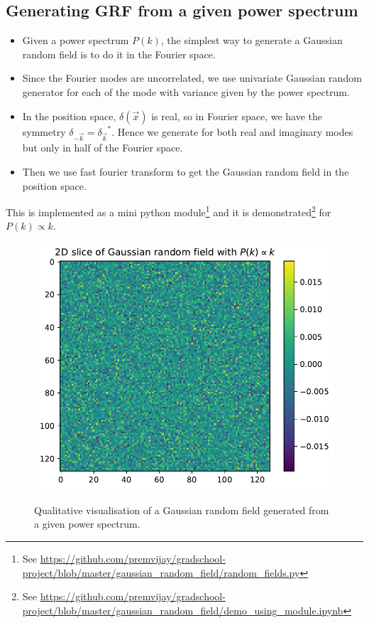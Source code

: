 \documentclass[12pt]{article}
\begin{document}
\subsection{Generating GRF from a given power spectrum}
\begin{itemize}
\item Given a power spectrum $P(k)$, the simplest way to generate a Gaussian random field is to do it in the Fourier space.
\item Since the Fourier modes are uncorrelated, we use univariate Gaussian random generator for each of the mode with variance given by the power spectrum.
\item In the position space, $\delta (\vec{x})$ is real, so in Fourier space, we have the symmetry $\delta_{-\vec{k}}= {\delta_{\vec{k}}}^{*}$. Hence we generate for both real and imaginary modes but only in half of the Fourier space.
\item Then we use fast fourier transform to get the Gaussian random field in the position space.
\end{itemize}
This is implemented as a mini python module\footnote{See \url{https://github.com/premvijay/gradschool-project/blob/master/gaussian_random_field/random_fields.py}} and it is demonstrated\footnote{See \url{https://github.com/premvijay/gradschool-project/blob/master/gaussian_random_field/demo_using_module.ipynb}} for $P(k) \propto k$.
\begin{figure}[H]
	\centering
	\caption{Qualitative visualisation of a Gaussian random field generated from a given power spectrum.}
	\includegraphics[width=0.7\linewidth]{../gaussian_random_field/GRF-scale-invariant-spectrum}
	\label{fig:grf-scale-invariant-spectrum}
\end{figure}

\pagebreak
\end{document}
